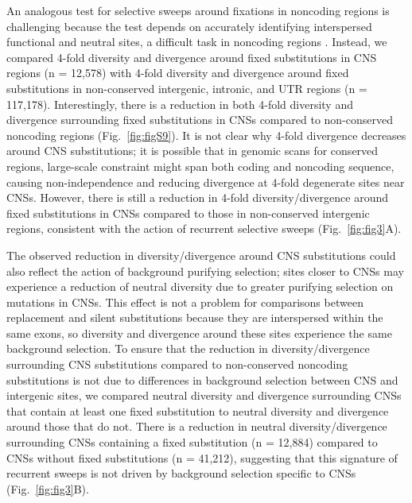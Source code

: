 An analogous test for selective sweeps around fixations in noncoding regions is challenging because the test depends on accurately identifying interspersed functional and neutral sites, a difficult task in noncoding regions \citep{Halligan2013}. Instead, we compared 4-fold diversity and divergence around fixed substitutions in CNS regions (n = 12,578) with 4-fold diversity and divergence around fixed substitutions in non-conserved intergenic, intronic, and UTR regions (n = 117,178). Interestingly, there is a reduction in both 4-fold diversity and divergence surrounding fixed substitutions in CNSs compared to non-conserved noncoding regions (Fig.~\ref{fig:figS9}). It is not clear why 4-fold divergence decreases around CNS substitutions; it is possible that in genomic scans for conserved regions, large-scale constraint might span both coding and noncoding sequence, causing non-independence and reducing divergence at 4-fold degenerate sites near CNSs. However, there is still a reduction in 4-fold diversity/divergence around fixed substitutions in CNSs compared to those in non-conserved intergenic regions, consistent with the action of recurrent selective sweeps (Fig.~\ref{fig:fig3}A). 

The observed reduction in diversity/divergence around CNS substitutions could also reflect the action of background purifying selection; sites closer to CNSs may experience a reduction of neutral diversity due to greater purifying selection on mutations in CNSs. This effect is not a problem for comparisons between replacement and silent substitutions because they are interspersed within the same exons, so diversity and divergence around these sites experience the same background selection. To ensure that the reduction in diversity/divergence surrounding CNS substitutions compared to non-conserved noncoding substitutions is not due to differences in background selection between CNS and intergenic sites, we compared neutral diversity and divergence surrounding CNSs that contain at least one fixed substitution to neutral diversity and divergence around those that do not. There is a reduction in neutral diversity/divergence surrounding CNSs containing a fixed substitution (n = 12,884) compared to CNSs without fixed substitutions (n = 41,212), suggesting that this signature of recurrent sweeps is not driven by background selection specific to CNSs (Fig.~\ref{fig:fig3}B).

